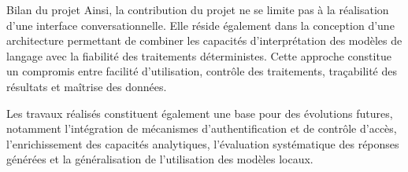 \begin{resultbox}{Bilan du projet}
Ainsi, la contribution du projet ne se limite pas à la réalisation d'une interface conversationnelle. Elle réside également dans la conception d'une architecture permettant de combiner les capacités d'interprétation des modèles de langage avec la fiabilité des traitements déterministes. Cette approche constitue un compromis entre facilité d'utilisation, contrôle des traitements, traçabilité des résultats et maîtrise des données.

Les travaux réalisés constituent également une base pour des évolutions futures, notamment l'intégration de mécanismes d'authentification et de contrôle d'accès, l'enrichissement des capacités analytiques, l'évaluation systématique des réponses générées et la généralisation de l'utilisation des modèles locaux.

\end{resultbox}
